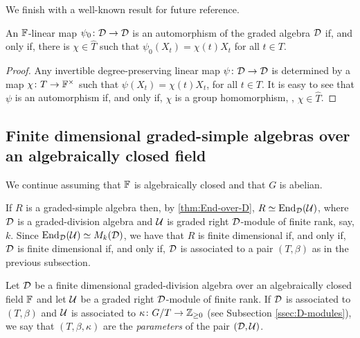 We finish with a well-known result for future reference.

\begin{lemma}\label{lemma:Aut(D)-widehat-T}
    An $\mathbb{F}$-linear map $\psi_0\colon \mathcal{D} \to \mathcal{D}$ is an automorphism of the graded algebra $\mathcal{D}$ if, and only if, there is $\chi \in \widehat T$ such that $\psi_0( X_t ) = \chi(t) X_t$ for all $t\in T$. 
\end{lemma}

\begin{proof}
    Any invertible degree-preserving linear map $\psi\colon \mathcal{D} \to \mathcal{D}$ is determined by a map $\chi\colon T \to \mathbb{F}^\times$ such that $\psi(X_t) = \chi(t) X_t$, for all $t\in T$. 
    It is easy to see that $\psi$ is an automorphism if, and only if, $\chi$ is a group homomorphism, \ie, $\chi \in \widehat T$. 
\end{proof}


\subsection{Finite dimensional graded-simple algebras over an algebraically closed field}\label{ssec:param-End_D-U}

We continue assuming that $\mathbb{F}$ is algebraically closed and that $G$ is abelian.

If $R$ is a graded-simple algebra then, by \cref{thm:End-over-D}, $R \simeq \operatorname{End}_{\mathcal{D}} (\mathcal U)$, where $\mathcal{D}$ is a graded-division algebra and $\mathcal U$ is graded right $\mathcal{D}$-module of finite rank, say, $k$. 
Since $\operatorname{End}_{\mathcal{D}} (\mathcal U) \simeq M_k(\mathcal{D})$, we have that $R$ is finite dimensional if, and only if, $\mathcal{D}$ is finite dimensional if, and only if, $\mathcal{D}$ is associated to a pair $(T,\beta)$ as in the previous subsection.

\begin{defi}\label{def:E(D,U)}
    Let $\mathcal{D}$ be a finite dimensional graded-division algebra over an algebraically closed field $\mathbb{F}$ and let $\mathcal U$ be a graded right $\mathcal{D}$-module of finite rank. 
	If $\mathcal{D}$ is associated to $(T, \beta)$ and $\mathcal U$ is associated to $\kappa\colon G/T \to \mathbb{Z}_{\geq 0}$ (see Subsection \ref{ssec:D-modules}), we say that $(T, \beta, \kappa)$ are the \emph{parameters} of the pair $(\mathcal{D}, \mathcal U)$.
\end{defi}

